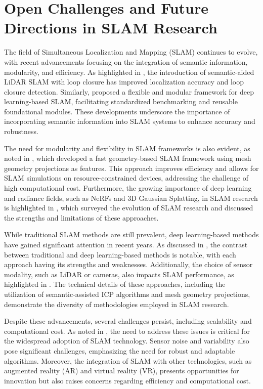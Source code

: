 \documentclass[conference]{IEEEtran}
\begin{document}
\section{Open Challenges and Future Directions in SLAM Research}
The field of Simultaneous Localization and Mapping (SLAM) continues to evolve, with recent advancements focusing on the integration of semantic information, modularity, and efficiency. As highlighted in \cite{b1}, the introduction of semantic-aided LiDAR SLAM with loop closure has improved localization accuracy and loop closure detection. Similarly, \cite{b2} proposed a flexible and modular framework for deep learning-based SLAM, facilitating standardized benchmarking and reusable foundational modules. These developments underscore the importance of incorporating semantic information into SLAM systems to enhance accuracy and robustness.

The need for modularity and flexibility in SLAM frameworks is also evident, as noted in \cite{b3}, which developed a fast geometry-based SLAM framework using mesh geometry projections as features. This approach improves efficiency and allows for SLAM simulations on resource-constrained devices, addressing the challenge of high computational cost. Furthermore, the growing importance of deep learning and radiance fields, such as NeRFs and 3D Gaussian Splatting, in SLAM research is highlighted in \cite{b4}, which surveyed the evolution of SLAM research and discussed the strengths and limitations of these approaches.

While traditional SLAM methods are still prevalent, deep learning-based methods have gained significant attention in recent years. As discussed in \cite{b5}, the contrast between traditional and deep learning-based methods is notable, with each approach having its strengths and weaknesses. Additionally, the choice of sensor modality, such as LiDAR or cameras, also impacts SLAM performance, as highlighted in \cite{b6}. The technical details of these approaches, including the utilization of semantic-assisted ICP algorithms and mesh geometry projections, demonstrate the diversity of methodologies employed in SLAM research.

Despite these advancements, several challenges persist, including scalability and computational cost. As noted in \cite{b7}, the need to address these issues is critical for the widespread adoption of SLAM technology. Sensor noise and variability also pose significant challenges, emphasizing the need for robust and adaptable algorithms. Moreover, the integration of SLAM with other technologies, such as augmented reality (AR) and virtual reality (VR), presents opportunities for innovation but also raises concerns regarding efficiency and computational cost.
\end{document}
